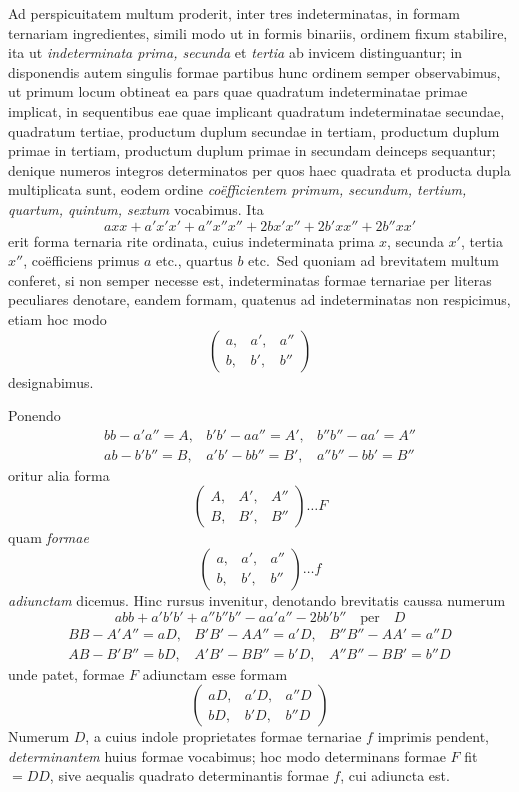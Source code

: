 Ad perspicuitatem multum proderit, inter tres indeterminatas, in formam
ternariam ingredientes, simili modo ut in formis binariis, ordinem fixum stabilire,
ita ut \textit{indeterminata prima, secunda} et \textit{tertia} ab invicem distinguantur; in disponendis
autem singulis formae partibus hunc ordinem semper observabimus, ut
primum locum obtineat ea pars quae quadratum indeterminatae primae implicat,
in sequentibus eae quae implicant quadratum indeterminatae secundae, quadratum
tertiae, productum duplum secundae in tertiam, productum duplum primae
in tertiam, productum duplum primae in secundam deinceps sequantur; denique
numeros integros determinatos per quos haec quadrata et producta dupla multiplicata
sunt, eodem ordine \textit{co\"efficientem primum, secundum, tertium, quartum, quintum,
sextum} vocabimus. Ita
\[
axx+a'x'x'+a''x''x''+2bx'x''+2b'xx''+2b''xx'
\]
erit forma ternaria rite ordinata, cuius indeterminata prima $x$, secunda $x'$, tertia
$x''$, co\"efficiens primus $a$ etc., quartus $b$ etc.\ Sed quoniam ad brevitatem multum
conferet, si non semper necesse est, indeterminatas formae ternariae per literas
peculiares denotare, eandem formam, quatenus ad indeterminatas non respicimus,
etiam hoc modo
\[
\begin{pmatrix}
a, & a', & a'' \\
b, & b', & b''
\end{pmatrix}
\]
designabimus.

Ponendo
\[
\begin{array}{lll}
bb-a'a''=A, & b'b'-aa''=A', & b''b''-aa'=A'' \\
ab-b'b''=B, & a'b'-bb''=B', & a''b''-bb'=B''
\end{array}
\]
oritur alia forma
\[
\begin{pmatrix}
A, & A', & A'' \\
B, & B', & B''
\end{pmatrix}\ldots F
\]
quam \textit{formae}
\[
\begin{pmatrix}
a, & a', & a'' \\
b, & b', & b''
\end{pmatrix}\ldots f
\]
\textit{adiunctam} dicemus. Hinc rursus invenitur, denotando brevitatis caussa numerum
\[
abb+a'b'b'+a''b''b''-aa'a''-2bb'b''\quad\text{per}\quad D
\]
\[
\begin{array}{lll}
BB-A'A''=aD, & B'B'-AA''=a'D, & B''B''-AA'=a''D \\
AB-B'B''=bD, & A'B'-BB''=b'D, & A''B''-BB'=b''D
\end{array}
\]
unde patet, formae $F$ adiunctam esse formam
\[
\begin{pmatrix}
aD, & a'D, & a''D \\
bD, & b'D, & b''D
\end{pmatrix}
\]
Numerum $D$, a cuius indole proprietates formae ternariae $f$ imprimis pendent,
\textit{determinantem} huius formae vocabimus; hoc modo determinans formae $F$ fit
$=DD$, sive aequalis quadrato determinantis formae $f$, cui adiuncta est.

